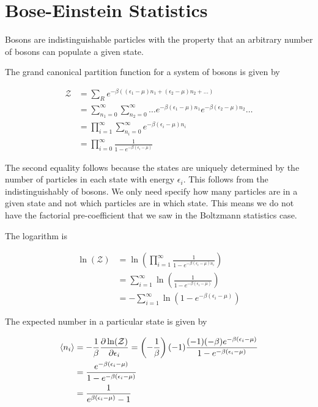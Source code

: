 \documentclass[12pt]{article}
\newcommand{\ep}{\epsilon}
\newcommand{\mc}[1]{\mathcal{#1}}
\begin{document}
\section{Bose-Einstein Statistics}

Bosons are indistinguishable particles with the property that an arbitrary number of bosons can populate a given state.

The grand canonical partition function for a system of bosons is given by

\begin{align}
\mc{Z} &= \sum_R e^{-\beta((\ep_1 - \mu)n_1 + (\ep_2 - \mu)n_2 + \ldots)}\\
&= \sum_{n_1=0}^{\infty} \sum_{n_2=0}^{\infty}\ldots e^{-\beta(\ep_1-\mu)n_1}e^{-\beta(\ep_2-\mu)n_2}\ldots\\
&= \prod_{i=1}^{\infty} \sum_{n_i=0}^{\infty} e^{-\beta(\ep_i-\mu)n_i}\\
&= \prod_{i=0}^{\infty} \frac{1}{1-e^{-\beta(\ep_i-\mu)}}
\end{align}

The second equality follows because the states are uniquely determined by the number of particles in each state with energy $\ep_i$. This follows from the indistinguishably of bosons. We only need specify how many particles are in a given state and not which particles are in which state. This means we do not have the factorial pre-coefficient that we saw in the Boltzmann statistics case.

The logarithm is

\begin{align}
\ln(\mc{Z}) &= \ln\left(\prod_{i=1}^{\infty} \frac{1}{1-e^{-\beta(\ep_i-\mu)n_i}}\right)\\ 
&= \sum_{i=1}^{\infty}\ln\left(\frac{1}{1-e^{-\beta(\ep_i-\mu)}}\right)\\
&= -\sum_{i=1}^{\infty} \ln(1-e^{-\beta(\ep_i-\mu)})
\end{align}

The expected number in a particular state is given by

\begin{align}
\braket{n_i} &= -\frac{1}{\beta} \frac{\partial \ln(\mc{Z})}{\partial \ep_i} = \left(-\frac{1}{\beta}\right) (-1)\frac{(-1)(-\beta)e^{-\beta(\ep_i-\mu)}}{1-e^{-\beta(\ep_i-\mu)}}\\
&= \frac{e^{-\beta(\ep_i-\mu)}}{1-e^{-\beta(\ep_i-\mu)}}\\
&= \frac{1}{e^{\beta(\ep_i-\mu)}-1}
\end{align}
\end{document}
